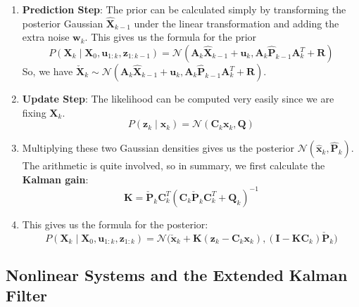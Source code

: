 \documentclass{article}
\theoremstyle{definition}
\theoremstyle{remark}
\theoremstyle{definition}
\begin{document}
\begin{enumerate}
    \item \textbf{Prediction Step}: The prior can be calculated simply by transforming the posterior Gaussian $\hat{\mathbf{X}}_{k-1}$ under the linear transformation and adding the extra noise $\mathbf{w}_k$. This gives us the formula for the prior 
    \[P(\mathbf{X}_k \mid \mathbf{X}_0, \mathbf{u}_{1:k}, \mathbf{z}_{1:k-1}) = \mathcal{N}(\mathbf{A}_k \hat{\mathbf{X}}_{k-1} + \mathbf{u}_k, \mathbf{A}_k \hat{\mathbf{P}}_{k-1} \mathbf{A}_k^T + \mathbf{R})\]
    So, we have $\check{\mathbf{X}}_{k} \sim \mathcal{N}(\mathbf{A}_k \hat{\mathbf{X}}_{k-1} + \mathbf{u}_k, \mathbf{A}_k \hat{\mathbf{P}}_{k-1} \mathbf{A}_k^T + \mathbf{R})$. 
    \item \textbf{Update Step}: The likelihood can be computed very easily since we are fixing $\mathbf{X}_k$. 
    \[P(\mathbf{z}_k \mid \mathbf{x}_k) = \mathcal{N}(\mathbf{C}_k \mathbf{x}_k, \mathbf{Q})\]
    \item Multiplying these two Gaussian densities gives us the posterior $\mathcal{N}(\hat{\mathbf{x}}_k, \hat{\mathbf{P}}_k)$. The arithmetic is quite involved, so in summary, we first calculate the \textbf{Kalman gain}: 
    \[\mathbf{K} = \check{\mathbf{P}}_k \mathbf{C}_k^T ( \mathbf{C}_k \check{\mathbf{P}}_k \mathbf{C}_k^T + \mathbf{Q}_k)^{-1}\]
    \item This gives us the formula for the posterior: 
    \[P (\mathbf{X}_k \mid \mathbf{X}_0, \mathbf{u}_{1:k}, \mathbf{z}_{1:k}) = \mathcal{N} \big( \check{\mathbf{x}}_k + \mathbf{K}(\mathbf{z}_k - \mathbf{C}_k \mathbf{x}_k), (\mathbf{I} - \mathbf{K} \mathbf{C}_k ) \check{\mathbf{P}}_k \big)\]
\end{enumerate}

\subsection{Nonlinear Systems and the Extended Kalman Filter}
\end{document}
